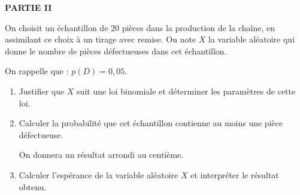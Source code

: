 \begin{center}
	\textbf{PARTIE II}
\end{center}

On choisit un échantillon de 20 pièces dans la production de la chaîne, en assimilant ce choix à un tirage avec remise. On note $X$ la variable aléatoire qui donne le nombre de pièces défectueuses dans cet échantillon.

On rappelle que : $p(D) = 0,05$.

\begin{enumerate}
	\item Justifier que $X$ suit une loi binomiale et déterminer les paramètres de cette loi.
	\item Calculer la probabilité que cet échantillon contienne au moins une pièce défectueuse.
	
	On donnera un résultat arrondi au centième.
	\item Calculer l'espérance de la variable aléatoire $X$ et interpréter le résultat obtenu.
\end{enumerate}

